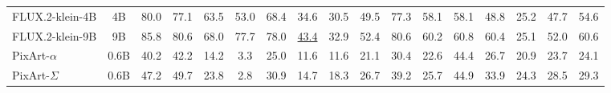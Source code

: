 \begin{table}[t]
{\begin{tabular}{lcccccccccccccccc}
FLUX.2-klein-4B                  & 4B                                 & 80.0                                 & 77.1                                 & 63.5                                 & 53.0                                 & \cellcolor[HTML]{E2E2E2}68.4                                 & 34.6                                 & 30.5                                 & 49.5                                 & 77.3                                 & 58.1                                 & 58.1                                 & 48.8                                 & 25.2                                 & \cellcolor[HTML]{E2E2E2}47.7                                 & 54.6                                 \\
FLUX.2-klein-9B                  & 9B                                 & 85.8                                 & 80.6                                 & 68.0                                 & 77.7                                 & \cellcolor[HTML]{E2E2E2}78.0                                 & {\color[HTML]{F88825} \underline{43.4}}    & 32.9                                 & 52.4                                 & 80.6                                 & 60.2                                 & 60.8                                 & 60.4                                 & 25.1                                 & \cellcolor[HTML]{E2E2E2}52.0                                 & 60.6                                 \\
PixArt-$\alpha$                  & 0.6B                               & 40.2                                 & 42.2                                 & 14.2                                 & 3.3                                  & \cellcolor[HTML]{E2E2E2}25.0                                 & 11.6                                 & 11.6                                 & 21.1                                 & 30.4                                 & 22.6                                 & 44.4                                 & 26.7                                 & 20.9                                 & \cellcolor[HTML]{E2E2E2}23.7                                 & 24.1                                 \\
PixArt-$\Sigma$                  & 0.6B                               & 47.2                                 & 49.7                                 & 23.8                                 & 2.8                                  & \cellcolor[HTML]{E2E2E2}30.9                                 & 14.7                                 & 18.3                                 & 26.7                                 & 39.2                                 & 25.7                                 & 44.9                                 & 33.9                                 & 24.3                                 & \cellcolor[HTML]{E2E2E2}28.5                                 & 29.3                                 \\

\end{tabular}}
\end{table}

